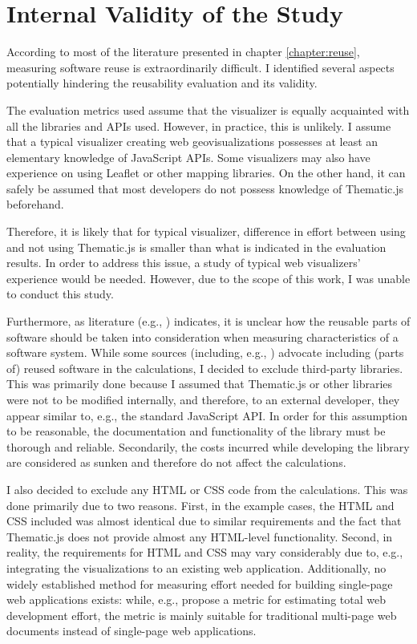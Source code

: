 \section{Internal Validity of the Study}
\label{section:internalvalidity}

According to most of the literature presented in chapter \ref{chapter:reuse}, measuring software reuse is extraordinarily difficult. I identified several aspects potentially hindering the reusability evaluation and its validity.

The evaluation metrics used assume that the visualizer is equally acquainted with all the libraries and APIs used. However, in practice, this is unlikely. I assume that a typical visualizer creating web geovisualizations possesses at least an elementary knowledge of JavaScript APIs. Some visualizers may also have experience on using Leaflet or other mapping libraries. On the other hand, it can safely be assumed that most developers do not possess knowledge of Thematic.js beforehand. 

Therefore, it is likely that for typical visualizer, difference in effort between using and not using Thematic.js is smaller than what is indicated in the evaluation results. In order to address this issue, a study of typical web visualizers' experience would be needed. However, due to the scope of this work, I was unable to conduct this study.

Furthermore, as literature (e.g., \citealt{frakes_success_1994,mohagheghi_quality_2007}) indicates, it is unclear how the reusable parts of software should be taken into consideration when measuring characteristics of a software system. While some sources (including, e.g., \citealt{frakes_software_1996,selby_enabling_2005}) advocate including (parts of) reused software in the calculations, I decided to exclude third-party libraries. This was primarily done because I assumed that Thematic.js or other libraries were not to be modified internally, and therefore, to an external developer, they appear similar to, e.g., the standard JavaScript API. In order for this assumption to be reasonable, the documentation and functionality of the library must be thorough and reliable. Secondarily, the costs incurred while developing the library are considered as sunken and therefore do not affect the calculations.

I also decided to exclude any HTML or CSS code from the calculations. This was done primarily due to two reasons. First, in the example cases, the HTML and CSS included was almost identical due to similar requirements and the fact that Thematic.js does not provide almost any HTML-level functionality. Second, in reality, the requirements for HTML and CSS may vary considerably due to, e.g., integrating the visualizations to an existing web application. Additionally, no widely established method for measuring effort needed for building single-page web applications exists: while, e.g., \citet{mendes_web_2001} propose a metric for estimating total web development effort, the metric is mainly suitable for traditional multi-page web documents instead of single-page web applications.

